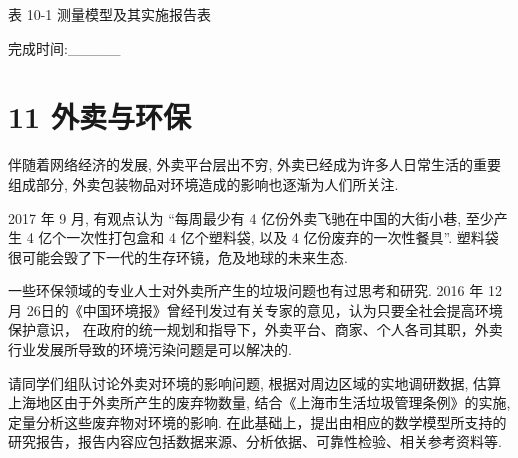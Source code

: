\documentclass[10pt]{article}
\begin{document}
表 10-1 测量模型及其实施报告表

完成时间:\_\_\_\_\_

\begin{center}
\end{center}

\section*{11 外卖与环保}

伴随着网络经济的发展, 外卖平台层出不穷, 外卖已经成为许多人日常生活的重要组成部分, 外卖包装物品对环境造成的影响也逐渐为人们所关注.

2017 年 9 月, 有观点认为 “每周最少有 4 亿份外卖飞驰在中国的大街小巷, 至少产生 4 亿个一次性打包盒和 4 亿个塑料袋, 以及 4 亿份废弃的一次性餐具”. 塑料袋很可能会毁了下一代的生存环镜，危及地球的未来生态.

一些环保领域的专业人士对外卖所产生的垃圾问题也有过思考和研究. 2016 年 12 月 26日的《中国环境报》曾经刊发过有关专家的意见，认为只要全社会提高环境保护意识， 在政府的统一规划和指导下，外卖平台、商家、个人各司其职，外卖行业发展所导致的环境污染问题是可以解决的.

请同学们组队讨论外卖对环境的影响问题, 根据对周边区域的实地调研数据, 估算上海地区由于外卖所产生的废弃物数量, 结合《上海市生活垃圾管理条例》的实施, 定量分析这些废弃物对环境的影响. 在此基础上，提出由相应的数学模型所支持的研究报告，报告内容应包括数据来源、分析依据、可靠性检验、相关参考资料等.
\end{document}
